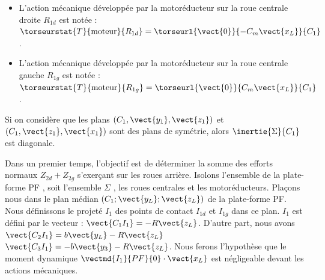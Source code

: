 \begin{itemize}
\item L'action mécanique développée par la motoréducteur sur la roue centrale droite $R_{1d}$ est notée : 
$\torseurstat{T}{\text{moteur}}{R_{1d}} = \torseurl{\vect{0}}{-C_m\vect{x_L}}{C_1}$.
\item L'action mécanique développée par la motoréducteur sur la roue centrale gauche $R_{1g}$ est notée : 
$\torseurstat{T}{\text{moteur}}{R_{1g}} = \torseurl{\vect{0}}{C_m\vect{x_L}}{C_1}$.
\end{itemize}
\fi

\ifprof
\begin{corrige}
Si on considère que les plans  $\left(C_1,\vect{y_1},\vect{z_1}\right)$ et 
$\left(C_1,\vect{z_1},\vect{x_1}\right)$ sont des plans de symétrie, alors $\inertie{\Sigma}{C_1}$ est diagonale.
\end{corrige}
\else
\fi


\ifprof
\else
Dans un premier temps, l’objectif est de déterminer la somme des efforts normaux $Z_{2d}+Z_{2g}$ s’exerçant sur les roues
arrière. Isolons l’ensemble de la plate-forme PF , soit l’ensemble $\Sigma$ , les roues centrales et les motoréducteurs.
Plaçons nous dans le plan médian $\left(C_1;\vect{y_L};\vect{z_L}\right)$ de la plate-forme PF. Nous définissons le projeté $I_1$ des points de contact $I_{1d}$ et $I_{1g}$ dans ce plan. $I_1$ est défini par le vecteur : $\vect{C_1I_1}=-R\vect{z_L}$. 
D’autre part, nous avons 
$\vect{C_2I_1} = b\vect{y_L}-R\vect{z_L}$
$\vect{C_3I_1} = -b\vect{y_3}-R\vect{z_L}$.
Nous ferons l’hypothèse que le moment dynamique $\vectmd{I_1}{PF}{0}\cdot \vect{x_L}$
est négligeable devant les actions mécaniques.

\fi

